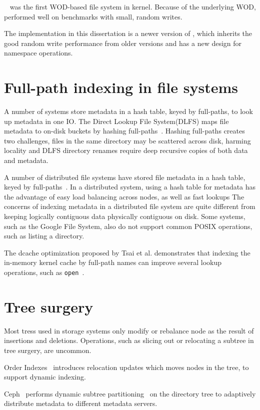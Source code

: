 \betrfs~\cite{betrfs1,betrfs1tos,betrfs2,betrfs2tos,betrfs3} was the first
WOD-based file system in kernel.
Because of the underlying WOD, \betrfs performed well on benchmarks
with small, random writes.

The implementation in this dissertation is a newer version of \betrfs,
which inherits the good random write performance from older versions and
has a new design for namespace operations.

\section{Full-path indexing in file systems}
A number of systems store metadata in a hash table, keyed by full-paths, to look
up metadata in one IO.
The Direct Lookup File System(DLFS) maps file metadata to on-disk buckets by
hashing full-paths~\citep{dlfs}.
Hashing full-paths creates two challenges, files in the same directory may be
scattered across disk, harming locality and DLFS directory renames require deep
recursive copies of both data and metadata.

A number of distributed file systems have stored file metadata in a hash table,
keyed by full-paths~\citep{gfs,nsidw,rdfs}.
In a distributed system, using a hash table for metadata has the advantage of
easy load balancing across nodes, as well as fast lookups
The concerns of indexing metadata in a distributed file system are quite
different from keeping logically contiguous data physically contiguous on disk.
Some systems, such as the Google File System, also do not support common POSIX
operations, such as listing a directory.

The dcache optimization proposed by Tsai et al. demonstrates that
indexing the in-memory kernel cache by full-path names can improve several
lookup operations, such as \texttt{open}~\citep{dcache}.

\section{Tree surgery}

Most tress used in storage systems only modify or rebalance node as the result
of insertions and deletions.
Operations, such as slicing out or relocating a subtree in tree surgery,
are uncommon.

Order Indexes~\citep{orderindex} introduces relocation updates which moves nodes
in the tree, to support dynamic indexing.

Ceph~\citep{ceph} performs dynamic subtree partitioning~\citep{cephtree} on the
directory tree to adaptively distribute metadata to different metadata servers.

